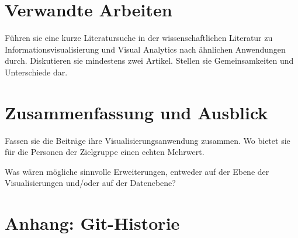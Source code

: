 \documentclass[usegeometry=true]{scrartcl}
\begin{document}
\section{Verwandte Arbeiten}
Führen sie eine kurze Literatursuche in der wissenschaftlichen Literatur zu Informationsvisualisierung und Visual Analytics nach ähnlichen Anwendungen durch. Diskutieren sie mindestens zwei Artikel. Stellen sie Gemeinsamkeiten und Unterschiede dar.

\section{Zusammenfassung und Ausblick}
Fassen sie die Beiträge ihre Visualisierungsanwendung zusammen. Wo bietet sie für die Personen der Zielgruppe einen echten Mehrwert.

Was wären mögliche sinnvolle Erweiterungen, entweder auf der Ebene der Visualisierungen und/oder auf der Datenebene?

\section*{Anhang: Git-Historie}

\printbibliography
\end{document}
